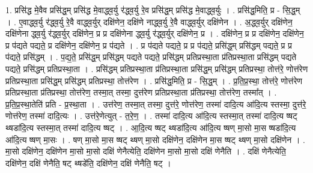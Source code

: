 \documentclass[17pt]{extarticle}
\begin{document}
1. प्रसि॑द्ध मे॒वैव प्रसि॑द्ध॒म् प्रसि॑द्ध मे॒वाद्ध्व॒र्यु र॑द्ध्व॒र्यु रे॒व प्रसि॑द्ध॒म् प्रसि॑द्ध मे॒वाद्ध्व॒र्युः । . प्रसि॑द्ध॒मिति॒ प्र - सि॒द्ध॒म् । . ए॒वाद्ध्व॒र्यु र॑द्ध्व॒र्यु रे॒वै वाद्ध्व॒र्युर् दक्षि॑णेन॒ दक्षि॑णे नाद्ध्व॒र्यु रे॒वै वाद्ध्व॒र्युर् दक्षि॑णेन । . अ॒द्ध्व॒र्युर् दक्षि॑णेन॒ दक्षि॑णेना द्ध्व॒र्यु र॑द्ध्व॒र्युर् दक्षि॑णेन॒ प्र प्र दक्षि॑णेना द्ध्व॒र्यु र॑द्ध्व॒र्युर् दक्षि॑णेन॒ प्र । . दक्षि॑णेन॒ प्र प्र दक्षि॑णेन॒ दक्षि॑णेन॒ प्र प॑द्यते पद्यते॒ प्र दक्षि॑णेन॒ दक्षि॑णेन॒ प्र प॑द्यते । . प्र प॑द्यते पद्यते॒ प्र प्र प॑द्यते॒ प्रसि॑द्ध॒म् प्रसि॑द्धम् पद्यते॒ प्र प्र प॑द्यते॒ प्रसि॑द्धम् । . प॒द्य॒ते॒ प्रसि॑द्ध॒म् प्रसि॑द्धम् पद्यते पद्यते॒ प्रसि॑द्धम् प्रतिप्रस्था॒ता प्र॑तिप्रस्था॒ता प्रसि॑द्धम् पद्यते पद्यते॒ प्रसि॑द्धम् प्रतिप्रस्था॒ता । . प्रसि॑द्धम् प्रतिप्रस्था॒ता प्र॑तिप्रस्था॒ता प्रसि॑द्ध॒म् प्रसि॑द्धम् प्रतिप्रस्था॒ तोत्त॑रे॒ णोत्त॑रेण प्रतिप्रस्था॒ता प्रसि॑द्ध॒म् प्रसि॑द्धम् प्रतिप्रस्था॒ तोत्त॑रेण । . प्रसि॑द्ध॒मिति॒ प्र - सि॒द्ध॒म् । . प्र॒ति॒प्र॒स्था॒ तोत्त॑रे॒ णोत्त॑रेण प्रतिप्रस्था॒ता प्र॑तिप्रस्था॒ तोत्त॑रेण॒ तस्मा॒त् तस्मा॒ दुत्त॑रेण प्रतिप्रस्था॒ता प्र॑तिप्रस्था॒ तोत्त॑रेण॒ तस्मा᳚त् । . प्र॒ति॒प्र॒स्था॒तेति॑ प्रति - प्र॒स्था॒ता । . उत्त॑रेण॒ तस्मा॒त् तस्मा॒ दुत्त॑रे॒ णोत्त॑रेण॒ तस्मा॑ दादि॒त्य आ॑दि॒त्य स्तस्मा॒ दुत्त॑रे॒ णोत्त॑रेण॒ तस्मा॑ दादि॒त्यः । . उत्त॑रे॒णेत्युत् - त॒रे॒ण॒ । . तस्मा॑ दादि॒त्य आ॑दि॒त्य स्तस्मा॒त् तस्मा॑ दादि॒त्य ष्षट् थ्षडा॑दि॒त्य स्तस्मा॒त् तस्मा॑ दादि॒त्य ष्षट् । . आ॒दि॒त्य ष्षट् थ्षडा॑दि॒त्य आ॑दि॒त्य ष्षण् मा॒सो मा॒स ष्षडा॑दि॒त्य आ॑दि॒त्य ष्षण् मा॒सः । . षण् मा॒सो मा॒स ष्षट् थ्षण् मा॒सो दक्षि॑णेन॒ दक्षि॑णेन मा॒स ष्षट् थ्षण् मा॒सो दक्षि॑णेन । . मा॒सो दक्षि॑णेन॒ दक्षि॑णेन मा॒सो मा॒सो दक्षि॑ णेनैत्येति॒ दक्षि॑णेन मा॒सो मा॒सो दक्षि॑ णेनैति । . दक्षि॑ णेनैत्येति॒ दक्षि॑णेन॒ दक्षि॑ णेनैति॒ षट् थ्षडे॑ति॒ दक्षि॑णेन॒ दक्षि॑ णेनैति॒ षट् । \newline
\end{document}
